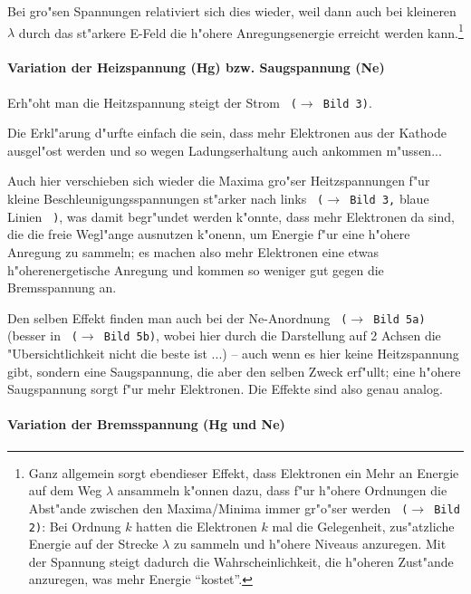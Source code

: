 \documentclass[a4paper,12pt]{article}
\newcommand{\abs}[0]{\bigskip\noindent}
\newcommand{\bild}[1]{\texttt{ ($\rightarrow$ Bild #1)}}
\newcommand{\bildd}[2]{\texttt{ ($\rightarrow$ Bild #1,} #2 \texttt{ )}}
\begin{document}
Bei gro"sen Spannungen
relativiert sich dies wieder, weil dann auch bei kleineren $\lambda$
durch das st"arkere E-Feld die h"ohere Anregungsenergie erreicht
werden kann.\footnote{Ganz allgemein sorgt ebendieser Effekt, dass
  Elektronen ein Mehr an Energie auf dem Weg $\lambda$ ansammeln
  k"onnen dazu, dass f"ur h"ohere Ordnungen die Abst"ande zwischen den
Maxima/Minima immer gr"o"ser werden \bild 2: Bei Ordnung $k$ hatten
die Elektronen $k$ mal die Gelegenheit, zus"atzliche Energie auf der
Strecke $\lambda$ zu sammeln und h"ohere Niveaus anzuregen. Mit der
Spannung steigt dadurch die Wahrscheinlichkeit, die h"oheren Zust"ande
anzuregen, was mehr Energie "`kostet"'.}






\paragraph{Variation der Heizspannung (Hg) bzw. Saugspannung (Ne)}
\label{sec:variation_der_heizspannung_hg}

Erh"oht man die Heitzspannung steigt der Strom \bild 3.

Die Erkl"arung d"urfte einfach die sein, dass mehr Elektronen aus der
Kathode ausgel"ost werden und so wegen Ladungserhaltung auch ankommen
m"ussen...

Auch hier verschieben sich wieder die Maxima gro"ser
Heitzspannungen f"ur kleine Beschleunigungsspannungen st"arker nach
links \bildd 3 {blaue Linien}, was damit begr"undet werden k"onnte, dass mehr Elektronen da
sind, die die freie Wegl"ange ausnutzen k"onenn, um Energie f"ur eine
h"ohere Anregung zu sammeln; es machen also mehr Elektronen eine etwas
h"oherenergetische Anregung und kommen so weniger gut gegen die
Bremsspannung an.

\abs
Den selben Effekt finden man auch bei der Ne-Anordnung \bild {5a}
(besser in \bild {5b}, wobei hier durch die Darstellung auf 2 Achsen
die "Ubersichtlichkeit nicht die beste ist ...) -- auch wenn es
hier keine Heitzspannung gibt, sondern eine Saugspannung, die aber den
selben Zweck erf"ullt; eine h"ohere Saugspannung sorgt f"ur mehr
Elektronen. Die Effekte sind also genau analog.



\paragraph{Variation der Bremsspannung (Hg und Ne)}
\label{sec:variation_der_bremsspannung_hg_und}
\end{document}
